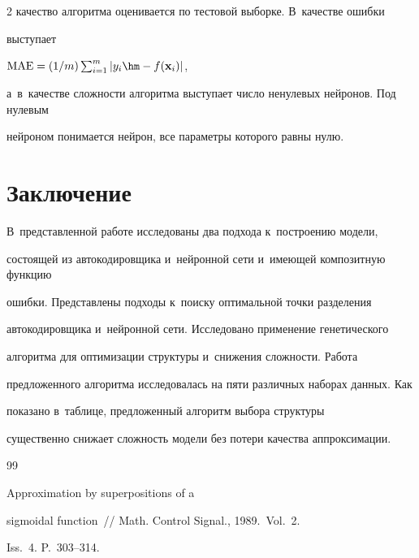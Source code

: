 \begin{multicols}{2}
качество алгоритма оценивается по тестовой выборке. В~качестве ошибки 


выступает %


$\mathrm{MAE} =({1}/{m}) \sum\nolimits_{i=1}^m|y_i\hm-f(\xb_i)|$, 


а~в~качестве сложности алгоритма выступает число ненулевых нейронов. Под нулевым 


нейроном понимается нейрон, все параметры которого равны нулю.





\section{Заключение}





В~представленной работе исследованы два подхода к~построению модели, 


состоящей из автокодировщика и~нейронной сети и~имеющей композитную функцию 


ошибки. Представлены \mbox{подходы} к~поиску оптимальной точки разделения 


автокодировщика и~нейронной сети. Исследовано применение генетического 


алгоритма для оптимизации структуры и~снижения сложности. Работа 


предложенного алгоритма исследовалась на пяти различных наборах данных. Как 


показано в~таб\-ли\-це, предложенный алгоритм выбора структуры  


существенно снижает сложность модели без потери качества аппроксимации.





{\small\frenchspacing


 {%




 \begin{thebibliography}{99}







 Approximation by superpositions of a 


sigmoidal function~// Math. Control Signal., 1989.~Vol.~2. 


Iss.~4. P.~303--314.



\end{thebibliography}}}
\end{multicols}
